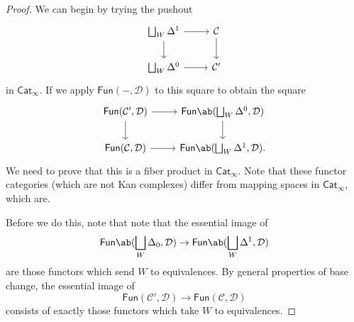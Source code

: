 \documentclass[10pt, oneside]{memoir}
\theoremstyle{definition}
\theoremstyle{remark}
\theoremstyle{plain}
\theoremstyle{definition}
\theoremstyle{remark}
\newcommand{\mc}[1]{\mathcal{#1}}
\newcommand{\ms}[1]{\mathsf{#1}}
\newcommand{\1}{\mathbf{1}}
\newcommand{\2}{\mathbf{2}}
\newcommand{\3}{\mathbf{3}}
\begin{document}
\begin{proof}
    We can begin by trying the pushout
    \begin{equation*}
    \begin{tikzcd}
        \bigsqcup_W \Delta^1 \ar{r} \ar{d} & \mc{C} \ar{d} \\
        \bigsqcup_W \Delta^0 \ar{r} & \mc{C}'
    \end{tikzcd}
    \end{equation*}
    in \(\ms{Cat}_{\infty} \). If we apply \(\ms{Fun}(-, \mc{D}) \) to this square to obtain the square
    \begin{equation*}
    \begin{tikzcd}
        \ms{Fun}(\mc{C}', \mc{D}) \ar{r} \ar{d} & \ms{Fun}\ab(\bigsqcup_W \Delta^0, \mc{D}) \ar{d} \\
        \ms{Fun}(\mc{C}, \mc{D}) \ar{r} & \ms{Fun}\ab(\bigsqcup_W \Delta^1, \mc{D}).
    \end{tikzcd}
    \end{equation*}
    We need to prove that this is a fiber product in \(\ms{Cat}_{\infty} \). Note that these functor categories (which are not Kan complexes) differ from mapping spaces in \(\ms{Cat}_{\infty} \), which are.

    Before we do this, note that note that the essential image of
    \[ \ms{Fun}\ab(\bigsqcup_W \Delta_0, \mc{D}) \to \ms{Fun}\ab(\bigsqcup_{W} \Delta^1, \mc{D}) \]
    are those functors which send \(W \) to equivalences. By general properties of base change, the essential image of
    \[ \ms{Fun}(\mc{C}', \mc{D}) \to \ms{Fun}(\mc{C}, \mc{D}) \]
    consists of exactly those functors which take \(W \) to equivalences.


\end{proof}
\end{document}
